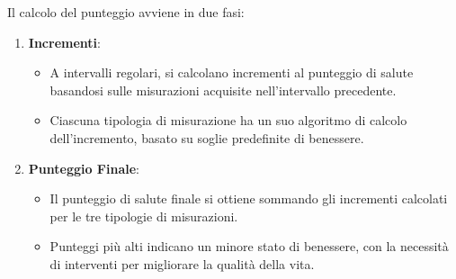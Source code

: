 Il calcolo del punteggio avviene in due fasi:
\begin{enumerate}
    \item \textbf{Incrementi}: 
    \begin{itemize}
        \item A intervalli regolari, si calcolano incrementi al punteggio di salute basandosi sulle misurazioni acquisite nell'intervallo precedente.
        \item Ciascuna tipologia di misurazione ha un suo algoritmo di calcolo dell'incremento, basato su soglie predefinite di benessere.
    \end{itemize}
    \item \textbf{Punteggio Finale}:
    \begin{itemize}
        \item Il punteggio di salute finale si ottiene sommando gli incrementi calcolati per le tre tipologie di misurazioni.
        \item Punteggi più alti indicano un minore stato di benessere, con la necessità di interventi per migliorare la qualità della vita.
    \end{itemize}
\end{enumerate}



